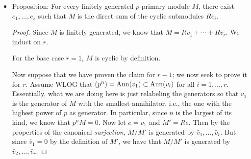 \documentclass[../notes.tex]{subfiles}
\begin{document}
\begin{itemize}
\begin{proof}
        We now begin the bidirectional inclusion argument in earnest. Our strategy is thus: We will construct a lift $w'$ of $v$, prove that $\Ann(v)\subset\Ann(w')$, and then prove that $\Ann(w')\subset\Ann(v)$. Let's begin.\par
        Pick any lift $w\in M$ of $v$. By hypothesis $p^kv=0$, so $p^kw\in M'$. It follows since $M'$ is cyclic that $p^kw=\alpha e$ for some $\alpha\in R$. Additionally, since $p^nM=0$ by hypothesis, we know that $p^nw=0$. Thus, since $n\geq k$, we have that
        \begin{equation*}
            0 = p^nw = p^{n-k}p^kw = p^{n-k}\alpha e
        \end{equation*}
        Thus, $p^{n-k}\alpha\in\Ann(e)$. It follows since $\Ann(e)=(p^n)$ by hypothesis that
        \begin{align*}
            p^{n-k}\alpha &= p^n\beta\\
            \alpha &= p^k\beta
        \end{align*}
        for some $\beta\in R$. Now define $w'=w-\beta e$. Note that $w'$ is still a lift of $v$ since we only added the element $-\beta e$ of $M'=Ae$ to it.\par
        In particular, we have that
        \begin{equation*}
            p^kw' = p^kw-p^k\beta e
            = p^kw-\alpha e
            = 0
        \end{equation*}
        This proves that $p^k\in\Ann(w')$. Since annihilators are ideals, as discussed above, it follows that $\Ann(v)=(p^k)\subset\Ann(w')$.\par
        To finish the proof, it will just suffice to show that $\Ann(w')\subset\Ann(v)$. Let $a\in\Ann(w')$ be arbitrary. Then $aw'=0$. It follows that $0=\pi(aw')=a\pi(w')=av$. Therefore, $a\in Ann(v)$ as well.
    \end{proof}
    \item Proposition: For every finitely generated $p$-primary module $M$, there exist $e_1,\dots,e_s$ such that $M$ is the direct sum of the cyclic submodules $Re_i$.
    \begin{proof}
        Since $M$ is finitely generated, we know that $M=Rv_1+\cdots+Rv_r$. We induct on $r$.\par
        For the base case $r=1$, $M$ is cyclic by definition.\par
        Now suppose that we have proven the claim for $r-1$; we now seek to prove it for $r$. Assume WLOG that $(p^n)=\operatorname{Ann}(v_1)\subset\operatorname{Ann}(v_i)$ for all $i=1,\dots,r$. Essentially, what we are doing here is just relabeling the generators so that $v_1$ is the generator of $M$ with the smallest annihilator, i.e., the one with the highest power of $p$ as generator. In particular, since $n$ is the largest of its kind, we know that $p^nM=0$. Now let $e=v_1$ and $M'=Re$. Then by the properties of the canonical \emph{surjection}, $M/M'$ is generated by $\bar{v}_1,\dots,\bar{v}_r$. But since $\bar{v}_1=0$ by the definition of $M'$, we have that $M/M'$ is generated by $\bar{v}_2,\dots,\bar{v}_r$.\par

\end{proof}
\end{itemize}
\end{document}
